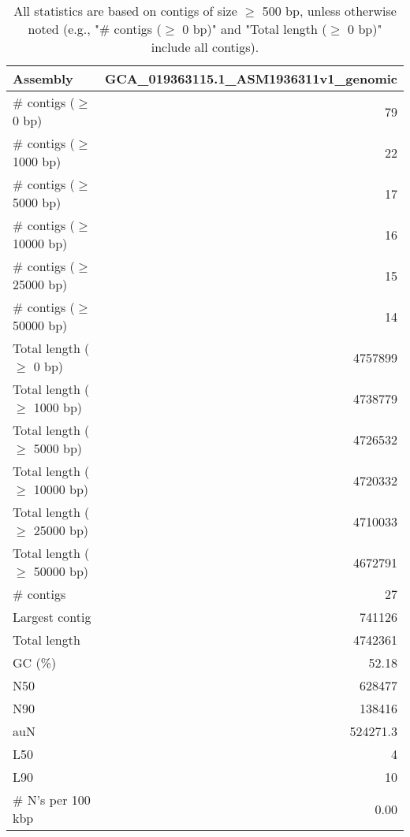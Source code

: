 \documentclass[12pt,a4paper]{article}
\begin{document}
\begin{table}[ht]
\begin{center}
\caption{All statistics are based on contigs of size $\geq$ 500 bp, unless otherwise noted (e.g., "\# contigs ($\geq$ 0 bp)" and "Total length ($\geq$ 0 bp)" include all contigs).}
\begin{tabular}{|l*{1}{|r}|}
\hline
Assembly & GCA\_019363115.1\_ASM1936311v1\_genomic \\ \hline
\# contigs ($\geq$ 0 bp) & 79 \\ \hline
\# contigs ($\geq$ 1000 bp) & 22 \\ \hline
\# contigs ($\geq$ 5000 bp) & 17 \\ \hline
\# contigs ($\geq$ 10000 bp) & 16 \\ \hline
\# contigs ($\geq$ 25000 bp) & 15 \\ \hline
\# contigs ($\geq$ 50000 bp) & 14 \\ \hline
Total length ($\geq$ 0 bp) & 4757899 \\ \hline
Total length ($\geq$ 1000 bp) & 4738779 \\ \hline
Total length ($\geq$ 5000 bp) & 4726532 \\ \hline
Total length ($\geq$ 10000 bp) & 4720332 \\ \hline
Total length ($\geq$ 25000 bp) & 4710033 \\ \hline
Total length ($\geq$ 50000 bp) & 4672791 \\ \hline
\# contigs & 27 \\ \hline
Largest contig & 741126 \\ \hline
Total length & 4742361 \\ \hline
GC (\%) & 52.18 \\ \hline
N50 & 628477 \\ \hline
N90 & 138416 \\ \hline
auN & 524271.3 \\ \hline
L50 & 4 \\ \hline
L90 & 10 \\ \hline
\# N's per 100 kbp & 0.00 \\ \hline
\end{tabular}
\end{center}
\end{table}
\end{document}
